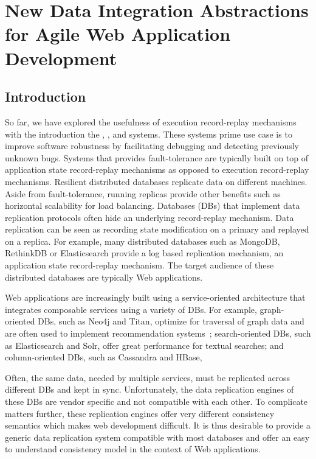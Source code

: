 \chapter{New Data Integration Abstractions for Agile Web Application Development}
\label{ch:synapse}

\section{Introduction}
\label{synapse:sec:intro}

So far, we have explored the usefulness of execution record-replay mechanisms
with the introduction the \scribe, \racepro, and \dora
systems. These systems prime use case is to improve software robustness by
facilitating debugging and detecting previously unknown bugs.
Systems that provides fault-tolerance are typically built on top of application
state record-replay mechanisms as opposed to execution record-replay mechanisms.
Resilient distributed databases replicate data on
different machines. Aside from fault-tolerance, running replicas provide other
benefits such as horizontal scalability for load balancing. Databases (DBs) that
implement data replication protocols often hide an underlying record-replay
mechanism. Data replication can be seen as recording state modification on a
primary and replayed on a replica. For example, many distributed databases such
as MongoDB, RethinkDB or Elasticsearch provide a log based replication mechanism,
an application state record-replay mechanism.  The target audience of these
distributed databases are typically Web applications.

Web applications are increasingly built using a service-oriented
architecture that integrates composable services using a variety of DBs.
For example, graph-oriented DBs, such as Neo4j and Titan, optimize for
traversal of graph data and are often used to implement recommendation
systems~\cite{db-revolution}; search-oriented DBs, such as
Elasticsearch and Solr, offer great performance for textual searches; and
column-oriented DBs, such as Cassandra and HBase,

Often, the same data, needed by multiple services, must be replicated across
different DBs and kept in sync. Unfortunately, the data replication engines of
these DBs are vendor specific and not compatible with each other. To complicate
matters further, these replication engines offer very different consistency
semantics which makes web development difficult.
It is thus desirable to provide a generic data replication system compatible
with most databases and offer an easy to understand consistency model in the
context of Web applications.

